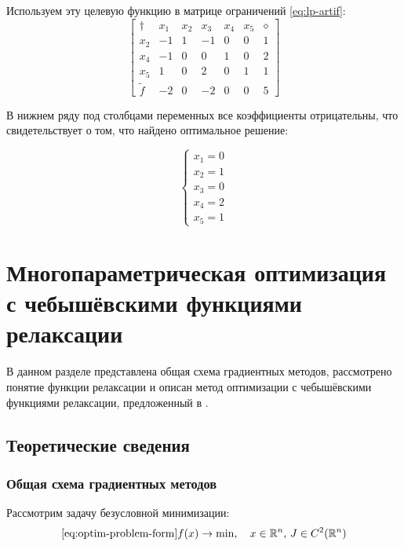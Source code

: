 \documentclass{article}
\newcommand{\set}[1]{\mathbb{#1}}
\theoremstyle{remark}
\theoremstyle{definition}
\numberwithin{equation}{section}
\begin{document}
Используем эту целевую функцию в матрице ограничений \eqref{eq:lp-artif}:
\begin{equation*}
  \begin{bmatrix}
    \dagger & x_1 & x_2 & x_3 & x_4 & x_5 & \diamond\\
    x_2 & -1 & 1 & -1 & 0 & 0 & 1\\
    x_4 & -1 & 0 &  0 & 1 & 0 & 2\\
    x_5 &  1 & 0 &  2 & 0 & 1 & 1\\
    \tilde{f} & -2 & 0 & -2 & 0 & 0 & 5
  \end{bmatrix}
\end{equation*}

В нижнем ряду под столбцами переменных все коэффициенты отрицательны,
что свидетельствует о том, что найдено оптимальное решение:

\begin{equation}
  \begin{cases}
    x_1 = 0\\
    x_2 = 1\\
    x_3 = 0\\
    x_4 = 2\\
    x_5 = 1
  \end{cases}
\end{equation}

\clearpage
\section{Многопараметрическая оптимизация\\
  с чебышёвскими функциями релаксации}
\label{sec:relch}

В данном разделе представлена общая схема градиентных методов,
рассмотрено понятие функции релаксации и описан метод оптимизации с
чебышёвскими функциями релаксации, предложенный в
\cite{chernorutsky04}.

\subsection{Теоретические сведения}

\subsubsection{Общая схема градиентных методов}

Рассмотрим задачу безусловной минимизации:
\begin{equation}
  \eqref{eq:optim-problem-form}
  f(x) \to \min,\quad x \in \set{R}^n,\, J \in C^2(\set{R}^n)
\end{equation}
\end{document}
